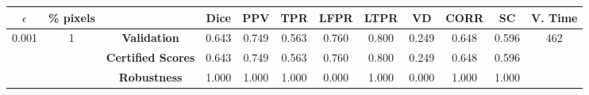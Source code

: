\begin{longtable}{ c  c | c | c  c  c  c  c  c  c c c}
\toprule \textbf{$\epsilon$} & \textbf{\% pixels} & & \textbf{Dice} & \textbf{PPV} & \textbf{TPR} & \textbf{LFPR} & \textbf{LTPR} & \textbf{VD} & \textbf{CORR} & \textbf{SC} & \textbf{V. Time} \\
\midrule 
\multirow{3}{*}{0.001}  & \multirow{3}{*}{1} &\textbf{Validation} & 0.643 & 0.749 & 0.563 & 0.760 & 0.800 & 0.249 & 0.648 & 0.596 & \multirow{3}{*}{462} \\
 & & \textbf{Certified Scores} & 0.643 & 0.749 & 0.563 & 0.760 & 0.800 & 0.249 & 0.648 & 0.596 & \\
& & \textbf{Robustness} & 1.000 & 1.000 & 1.000 & 0.000 & 1.000 & 0.000 & 1.000 & 1.000 & \\
\end{longtable}